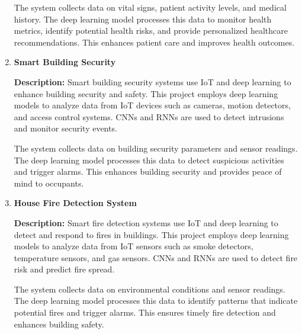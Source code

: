 \documentclass{article}
\begin{document}
\begin{enumerate}[label=\textbf{\arabic*.}, leftmargin=*]
The system collects data on vital signs, patient activity levels, and medical history. The deep learning model processes this data to monitor health metrics, identify potential health risks, and provide personalized healthcare recommendations. This enhances patient care and improves health outcomes.


\vspace{24pt}
\item \textbf{Smart Building Security}

\textbf{Description:}
Smart building security systems use IoT and deep learning to enhance building security and safety. This project employs deep learning models to analyze data from IoT devices such as cameras, motion detectors, and access control systems. CNNs and RNNs are used to detect intrusions and monitor security events.

The system collects data on building security parameters and sensor readings. The deep learning model processes this data to detect suspicious activities and trigger alarms. This enhances building security and provides peace of mind to occupants.



\vspace{24pt}
\item \textbf{House Fire Detection System}

\textbf{Description:}
Smart fire detection systems use IoT and deep learning to detect and respond to fires in buildings. This project employs deep learning models to analyze data from IoT sensors such as smoke detectors, temperature sensors, and gas sensors. CNNs and RNNs are used to detect fire risk and predict fire spread.

The system collects data on environmental conditions and sensor readings. The deep learning model processes this data to identify patterns that indicate potential fires and trigger alarms. This ensures timely fire detection and enhances building safety.




\end{enumerate}
\end{document}
